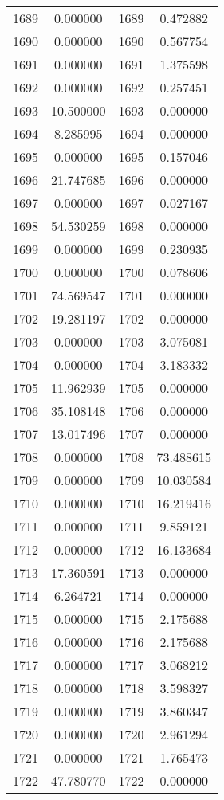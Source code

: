 \documentclass[12pt]{article}
\begin{document}
\begin{longtable}{@{}cccc@{}}
1689 & 0.000000 & 1689 & 0.472882 \\
1690 & 0.000000 & 1690 & 0.567754 \\
1691 & 0.000000 & 1691 & 1.375598 \\
1692 & 0.000000 & 1692 & 0.257451 \\
1693 & 10.500000 & 1693 & 0.000000 \\
1694 & 8.285995 & 1694 & 0.000000 \\
1695 & 0.000000 & 1695 & 0.157046 \\
1696 & 21.747685 & 1696 & 0.000000 \\
1697 & 0.000000 & 1697 & 0.027167 \\
1698 & 54.530259 & 1698 & 0.000000 \\
1699 & 0.000000 & 1699 & 0.230935 \\
1700 & 0.000000 & 1700 & 0.078606 \\
1701 & 74.569547 & 1701 & 0.000000 \\
1702 & 19.281197 & 1702 & 0.000000 \\
1703 & 0.000000 & 1703 & 3.075081 \\
1704 & 0.000000 & 1704 & 3.183332 \\
1705 & 11.962939 & 1705 & 0.000000 \\
1706 & 35.108148 & 1706 & 0.000000 \\
1707 & 13.017496 & 1707 & 0.000000 \\
1708 & 0.000000 & 1708 & 73.488615 \\
1709 & 0.000000 & 1709 & 10.030584 \\
1710 & 0.000000 & 1710 & 16.219416 \\
1711 & 0.000000 & 1711 & 9.859121 \\
1712 & 0.000000 & 1712 & 16.133684 \\
1713 & 17.360591 & 1713 & 0.000000 \\
1714 & 6.264721 & 1714 & 0.000000 \\
1715 & 0.000000 & 1715 & 2.175688 \\
1716 & 0.000000 & 1716 & 2.175688 \\
1717 & 0.000000 & 1717 & 3.068212 \\
1718 & 0.000000 & 1718 & 3.598327 \\
1719 & 0.000000 & 1719 & 3.860347 \\
1720 & 0.000000 & 1720 & 2.961294 \\
1721 & 0.000000 & 1721 & 1.765473 \\
1722 & 47.780770 & 1722 & 0.000000 \\

\end{longtable}
\end{document}

